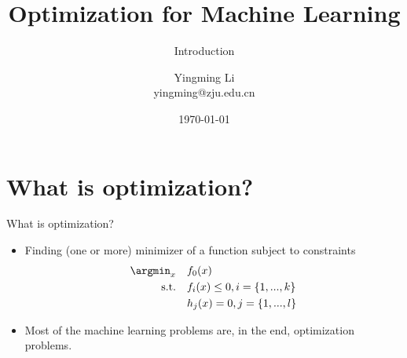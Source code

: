 \documentclass[notes]{beamer}
\title[Opt for ML]{Optimization for Machine Learning}
\subtitle{Introduction}
\author[YingmingLi]{Yingming Li \\ yingming@zju.edu.cn}
\institute[DSERC, ZJU]{Data Science \& Engineering Research Center, ZJU}
\date[\today]{\today}
\begin{document}
\begin{frame}
  \titlepage
\end{frame}



\section{What is optimization?} 

\begin{frame}{What is optimization?}
	\begin{itemize}
		\item<1-> Finding (one or more)  minimizer of a function subject to constraints 
			\begin{equation}
			\begin{aligned}
				\argmin_x \quad & f_0(x)  \\ 
				\textrm{s.t.} \quad & f_i(x) \le 0, i = \{1,...,k\} \\  
				 		\quad & h_j(x) = 0, j = \{1,...,l\} \\ 
			\end{aligned}
			\end{equation}
		\item<2-> Most of the machine learning problems are, in the end, optimization problems. 
	\end{itemize}
\end{frame}	
\end{document}
